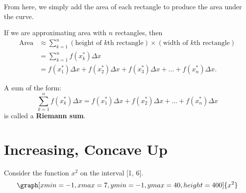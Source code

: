 \documentclass{ximera}
\begin{document}
From here, we simply add the area of each rectangle to produce the area under the curve.

If we are approximating area with $n$ rectangles, then
\begin{align*}
  \text{Area} &\approx \sum_{k=1}^n (\text{height of $k$th rectangle})\times(\text{width of $k$th rectangle}) \\
  &=\sum_{k=1}^n  f(x_k^*)\Delta x \\
  &=  f(x_1^*)\Delta x +  f(x_2^*)\Delta x +   f(x_3^*)\Delta x + \dots +   f(x_n^*)\Delta x.
\end{align*}
\begin{definition}
  A sum of the form:
  \[
  \sum_{k=1}^n  f(x_k^*)\Delta x  = f(x_1^*)\Delta x +  f(x_2^*)\Delta x + \dots +   f(x_n^*)\Delta x
  \]
  is called a \textbf{Riemann sum}.
\end{definition}

\section{Increasing, Concave Up}
Consider the function $x^2$ on the interval [1, 6].
\[
\graph[xmin=-1,xmax=7,ymin=-1,ymax=40,height=400]{x^2}
\]
\end{document}
